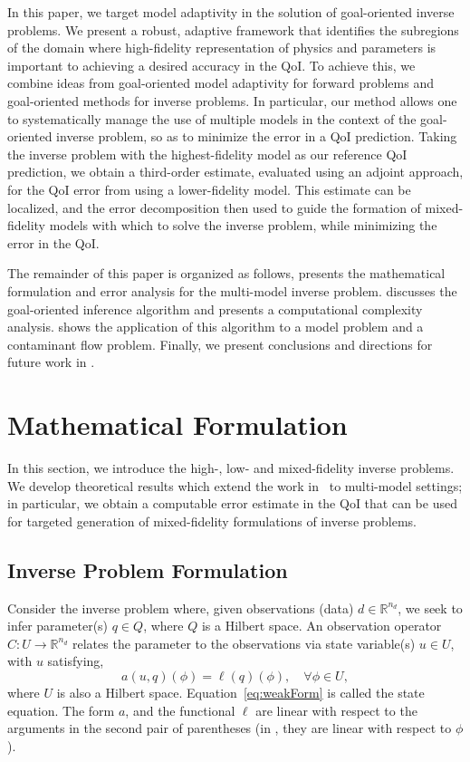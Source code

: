 \documentclass[review,sort&compress]{elsarticle}
\newcommand{\R}{{\mathbb{R}}}
\newcommand{\Reals}{{\mathbb{R}}}
\begin{document}
In this paper, we target model adaptivity in the solution of goal-oriented inverse problems. We present a robust, adaptive framework that identifies the subregions of the domain where high-fidelity representation of physics and parameters is important to achieving a desired accuracy in the QoI. To achieve this, we combine ideas from goal-oriented model adaptivity for forward problems and goal-oriented methods for inverse problems. In particular, our method allows one to systematically manage the use of multiple models in the context of the goal-oriented inverse problem, so as to minimize the error in a QoI prediction. Taking the inverse problem with the highest-fidelity model as our reference QoI prediction, we obtain a third-order estimate, evaluated using an adjoint approach, for the QoI error from using a lower-fidelity model. This estimate can be localized, and the error decomposition then used to guide the formation of mixed-fidelity models with which to solve the inverse problem, while minimizing the error in the QoI. 

The remainder of this paper is organized as follows,  presents the mathematical formulation and error analysis for the multi-model inverse problem.  discusses the goal-oriented inference algorithm and presents a computational complexity analysis.  shows the application of this algorithm to a model problem and a contaminant flow problem. Finally, we present conclusions and directions for future work in .


\section{Mathematical Formulation}\label{sec:form}
%
In this section, we introduce the high-, low- and mixed-fidelity inverse problems. We develop theoretical results which extend the work in~\cite{BecVex05} to multi-model settings; in particular, we obtain a computable error estimate in the QoI that can be used for targeted generation of mixed-fidelity formulations of inverse problems.

\subsection{Inverse Problem Formulation}  \label{sec:setup}
%
Consider the inverse problem where, given observations (data) $d\in\R^{n_d}$, we seek to infer parameter(s) $q\in Q$, where $Q$ is a Hilbert space. An observation operator $C:U\to\Reals^{n_d}$ relates the parameter to the observations via state variable(s) $u\in U$, with $u$ satisfying,
%
\begin{equation}
a(u,q)(\phi)=\ell(q)(\phi),\quad\forall\phi\in U,
\label{eq:weakForm}
\end{equation}
%
where $U$ is also a Hilbert space. Equation~\ref{eq:weakForm} is called the state equation. The form $a$, and the functional $\ell$ are linear with respect to the arguments in the second pair of parentheses (in , they are linear with respect to $\phi$).
\end{document}
